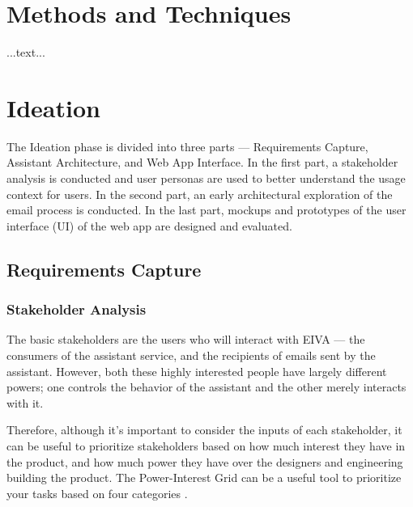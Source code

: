 \documentclass{article}
\begin{document}
\newpage

\section{Methods and Techniques}

...text...

\newpage

\section{Ideation}

The Ideation phase is divided into three parts --- Requirements Capture, Assistant Architecture, and Web App Interface. In the first part, a stakeholder analysis is conducted and user personas are used to better understand the usage context for users. In the second part, an early architectural exploration of the email process is conducted. In the last part, mockups and prototypes of the user interface (UI) of the web app are designed and evaluated.

\subsection{Requirements Capture}

\subsubsection{Stakeholder Analysis}

The basic stakeholders are the users who will interact with EIVA --- the consumers of the assistant service, and the recipients of emails sent by the assistant. However, both these highly interested people have largely different powers; one controls the behavior of the assistant and the other merely interacts with it.

Therefore, although it's important to consider the inputs of each stakeholder, it can be useful to prioritize stakeholders based on how much interest they have in the product, and how much power they have over the designers and engineering building the product. The Power-Interest Grid can be a useful tool to prioritize your tasks based on four categories \cite{noauthor_stakeholder_nodate}.
\end{document}
